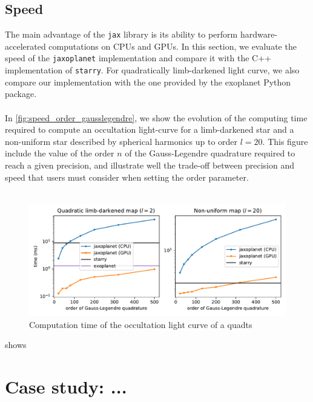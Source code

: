 \documentclass[modern]{aastex631}
\begin{document}
\subsection{Speed}\label{speed}

The main advantage of the \texttt{jax} library is its ability to perform hardware-accelerated computations on CPUs and GPUs. In this section, we evaluate the speed of the \texttt{jaxoplanet} implementation and compare it with the C++ implementation of \texttt{starry}. For quadratically limb-darkened light curve, we also compare our implementation with the one provided by the \textsf{exoplanet} Python package.\\\\
In \autoref{fig:speed_order_gausslegendre}, we show the evolution of the computing time required to compute an occultation light-curve for a limb-darkened star and a non-uniform star described by spherical harmonics up to order $l=20$. This figure include the value of the order $n$ of the Gauss-Legendre quadrature required to reach a given precision, and illustrate well the trade-off between precision and speed that users must consider when setting the order parameter.\\\\
\begin{figure}[H]
    \begin{center}
        \includegraphics[width=\textwidth]{../workflows/speed/figures/speed_vs_order.pdf}
        \caption{Computation time of the occultation light curve of a quadts}
        \label{fig:speed_order_gausslegendre}
    \end{center}
\end{figure}

\todo{} shows 

\section{Case study: ...}
\end{document}

